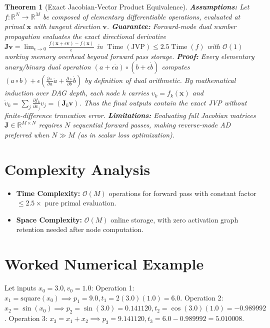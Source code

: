 \documentclass[11pt]{article}
\newtheorem{theorem}{Theorem}
\begin{document}
\begin{theorem}[Exact Jacobian-Vector Product Equivalence]
\label{thm:jvp_exactness}
\textbf{Assumptions:} Let $f: \mathbb{R}^N \to \mathbb{R}^M$ be composed of elementary differentiable operations, evaluated at primal $\mathbf{x}$ with tangent direction $\mathbf{v}$.
\textbf{Guarantee:} Forward-mode dual number propagation evaluates the exact directional derivative $\mathbf{J} \mathbf{v} = \lim_{\epsilon \to 0} \frac{f(\mathbf{x} + \epsilon \mathbf{v}) - f(\mathbf{x})}{\epsilon}$ in $\operatorname{Time}(\text{JVP}) \le 2.5 \operatorname{Time}(f)$ with $\mathcal{O}(1)$ working memory overhead beyond forward pass storage.
\textbf{Proof:}
Every elementary unary/binary dual operation $(a + \epsilon \dot{a}) \circ (b + \epsilon \dot{b})$ computes $(a \circ b) + \epsilon (\frac{\partial \circ}{\partial a} \dot{a} + \frac{\partial \circ}{\partial b} \dot{b})$ by definition of dual arithmetic. By mathematical induction over DAG depth, each node $k$ carries $v_k = f_k(\mathbf{x})$ and $\dot{v}_k = \sum_j \frac{\partial f_k}{\partial x_j} v_j = (\mathbf{J}_k \mathbf{v})$. Thus the final outputs contain the exact JVP without finite-difference truncation error.
\textbf{Limitations:} Evaluating full Jacobian matrices $\mathbf{J} \in \mathbb{R}^{M \times N}$ requires $N$ sequential forward passes, making reverse-mode AD preferred when $N \gg M$ (as in scalar loss optimization).
\end{theorem}

\section{Complexity Analysis}
\label{sec:complexity}

\begin{itemize}
    \item \textbf{Time Complexity:} $\mathcal{O}(M)$ operations for forward pass with constant factor $\le 2.5\times$ pure primal evaluation.
    \item \textbf{Space Complexity:} $\mathcal{O}(M)$ online storage, with zero activation graph retention needed after node computation.
\end{itemize}

\section{Worked Numerical Example}
\label{sec:worked_example}

Let inputs $x_0 = 3.0, v_0 = 1.0$:
Operation 1: $x_1 = \text{square}(x_0) \implies p_1 = 9.0, t_1 = 2(3.0)(1.0) = 6.0$.
Operation 2: $x_2 = \sin(x_0) \implies p_2 = \sin(3.0) = 0.141120, t_2 = \cos(3.0)(1.0) = -0.989992$.
Operation 3: $x_3 = x_1 + x_2 \implies p_3 = 9.141120, t_3 = 6.0 - 0.989992 = 5.010008$.
\end{document}
